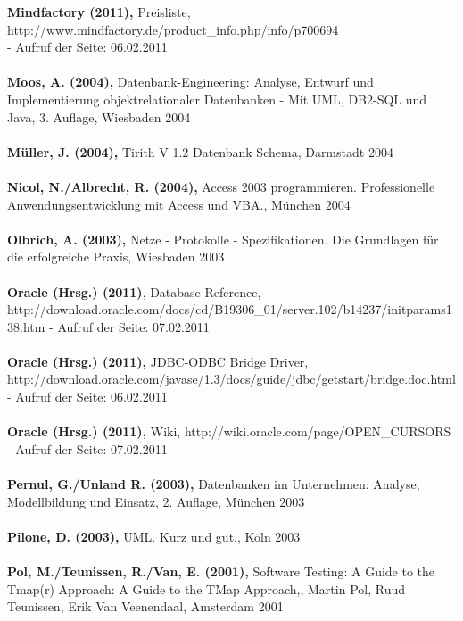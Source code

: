 \textbf{Mindfactory (2011),} Preisliste,\\http://www.mindfactory.de/product\_info.php/info/p700694\\ - Aufruf der Seite: 06.02.2011\\\\
\textbf{Moos, A. (2004),} Datenbank-Engineering: Analyse, Entwurf und Implementierung objektrelationaler Datenbanken - Mit UML, DB2-SQL und Java, 3. Auflage, Wiesbaden 2004\\\\
\textbf{Müller, J. (2004),} Tirith V 1.2 Datenbank Schema, Darmstadt 2004\\\\ 
\textbf{Nicol, N./Albrecht, R. (2004),} Access 2003 programmieren. Professionelle Anwendungsentwicklung mit Access und VBA., München 2004\\\\
\textbf{Olbrich, A. (2003),} Netze - Protokolle - Spezifikationen. Die Grundlagen für die erfolgreiche Praxis, Wiesbaden 2003\\\\
\textbf{Oracle (Hrsg.) (2011)}, Database Reference,\\http://download.oracle.com/docs/cd/B19306\_01/server.102/b14237/initparams138.htm - Aufruf der Seite: 07.02.2011\\\\
\textbf{Oracle (Hrsg.) (2011),} JDBC-ODBC Bridge Driver,\\ http://download.oracle.com/javase/1.3/docs/guide/jdbc/getstart/bridge.doc.html  - Aufruf der Seite: 06.02.2011\\\\
\clearpage
\textbf{Oracle (Hrsg.) (2011),} Wiki, http://wiki.oracle.com/page/OPEN\_CURSORS\\ - Aufruf der Seite: 07.02.2011\\\\
\textbf{Pernul, G./Unland R. (2003),} Datenbanken im Unternehmen: Analyse, Modellbildung und Einsatz, 2. Auflage, München 2003\\\\
\textbf{Pilone, D. (2003),} UML. Kurz und gut., Köln 2003\\\\
\textbf{Pol, M./Teunissen, R./Van, E. (2001),} Software Testing: A Guide to the Tmap(r) Approach: A Guide to the TMap Approach,, Martin Pol, Ruud Teunissen, Erik Van Veenendaal, Amsterdam 2001\\\\
